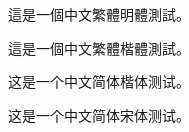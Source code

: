 \documentclass[a4paper]{article}
\begin{document}
\begin{CJK}{UTF8}{bsmi}
這是一個中文繁體明體測試。
\end{CJK}
\begin{CJK}{UTF8}{bkai}
這是一個中文繁體楷體測試。
\end{CJK}
\begin{CJK}{UTF8}{gkai}
这是一个中文简体楷体测试。
\end{CJK}
\begin{CJK}{UTF8}{gbsn}
这是一个中文简体宋体测试。
\end{CJK}
\end{document}

